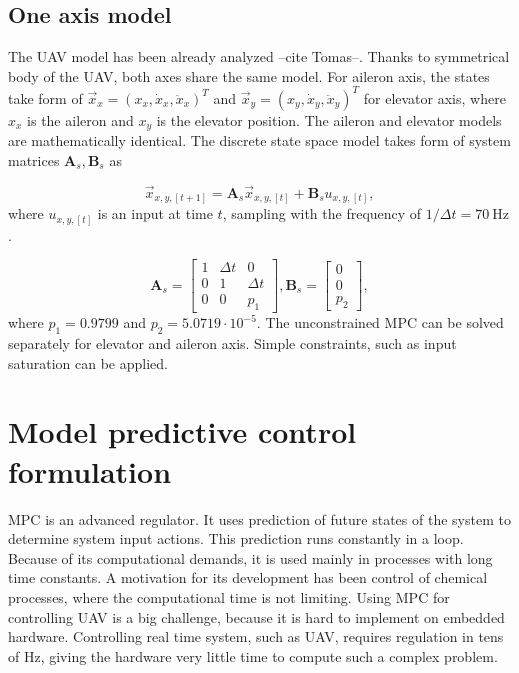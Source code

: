 \documentclass[a4paper,11pt,titlepage]{article}
\newcommand{\jed}[1]{\ensuremath{~\mathrm{#1}}}
\begin{document}


\subsection{One axis model}
The UAV model has been already analyzed --cite Tomas--. Thanks to symmetrical body of the UAV, both axes share the same model. For aileron axis, the states take form of $\vec{x}_x = (x_x, \dot{x}_x, \ddot{x}_x)^T$ and $\vec{x}_y = (x_y, \dot{x}_y, \ddot{x}_y)^T$ for elevator axis, where $x_x$ is the aileron and $x_y$ is the elevator position. The aileron and elevator models are mathematically identical. The discrete state space model takes form of system matrices $\textbf{A}_s, \textbf{B}_s$ as

\begin{equation}
\label{eq:state_space_model_simple}
\vec{x}_{x,y,[t+1]} = \textbf{A}_{s} \vec{x}_{x,y, [t]} +\textbf{B}_{s} u_{x,y, [t]},
\end{equation} 
where $u_{x,y,[t]}$ is an input at time $t$, sampling with the frequency of $1/\Delta t = 70\jed{Hz}$.

\begin{equation}
\textbf{A}_{s} =
  \begin{bmatrix}
  1 & \Delta t & 		0 \\
  0 & 		 1 & \Delta t \\
  0	& 		 0 &		p_1
  \end{bmatrix},\textbf{B}_{s} = \begin{bmatrix}
  0 \\
  0 \\
  p_2
  \end{bmatrix}, 
\end{equation}
where $p_1 = 0.9799$ and $p_2 = 5.0719\cdot10^{-5}$. The unconstrained MPC can be solved separately for elevator and aileron axis. Simple constraints, such as input saturation can be applied.

\section{Model predictive control formulation}
\label{sec:Model_predictive_control_formulation}

MPC is an advanced regulator. It uses prediction of future states of the system to determine system input actions. This prediction runs constantly in a loop. Because of its computational demands, it is used mainly in processes with long time constants. A motivation for its development has been control of chemical processes, where the computational time is not limiting. Using MPC for controlling UAV is a big challenge, because it is hard to implement on embedded hardware. Controlling real time system, such as UAV, requires regulation in tens of Hz, giving the hardware very little time to compute such a complex problem.
\end{document}
